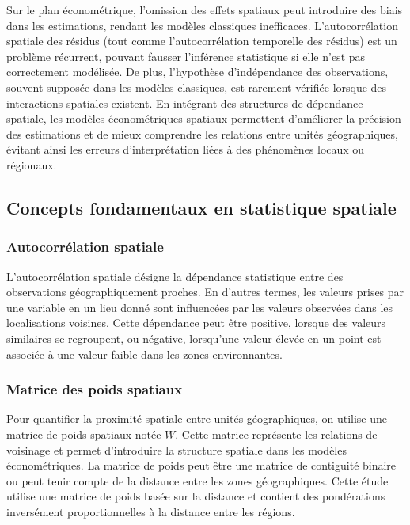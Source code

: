 \documentclass[
]{article}
\begin{document}
Sur le plan économétrique, l'omission des effets spatiaux peut
introduire des biais dans les estimations, rendant les modèles
classiques inefficaces. L'autocorrélation spatiale des résidus (tout
comme l'autocorrélation temporelle des résidus) est un problème
récurrent, pouvant fausser l'inférence statistique si elle n'est pas
correctement modélisée. De plus, l'hypothèse d'indépendance des
observations, souvent supposée dans les modèles classiques, est rarement
vérifiée lorsque des interactions spatiales existent. En intégrant des
structures de dépendance spatiale, les modèles économétriques spatiaux
permettent d'améliorer la précision des estimations et de mieux
comprendre les relations entre unités géographiques, évitant ainsi les
erreurs d'interprétation liées à des phénomènes locaux ou régionaux.

\subsection{Concepts fondamentaux en statistique
spatiale}\label{concepts-fondamentaux-en-statistique-spatiale}

\subsubsection{Autocorrélation
spatiale}\label{autocorruxe9lation-spatiale}

L'autocorrélation spatiale désigne la dépendance statistique entre des
observations géographiquement proches. En d'autres termes, les valeurs
prises par une variable en un lieu donné sont influencées par les
valeurs observées dans les localisations voisines. Cette dépendance peut
être positive, lorsque des valeurs similaires se regroupent, ou
négative, lorsqu'une valeur élevée en un point est associée à une valeur
faible dans les zones environnantes.

\subsubsection{Matrice des poids
spatiaux}\label{matrice-des-poids-spatiaux}

Pour quantifier la proximité spatiale entre unités géographiques, on
utilise une matrice de poids spatiaux notée \(W\). Cette matrice
représente les relations de voisinage et permet d'introduire la
structure spatiale dans les modèles économétriques. La matrice de poids
peut être une matrice de contiguité binaire ou peut tenir compte de la
distance entre les zones géographiques. Cette étude utilise une matrice
de poids basée sur la distance et contient des pondérations inversément
proportionnelles à la distance entre les régions.
\end{document}
